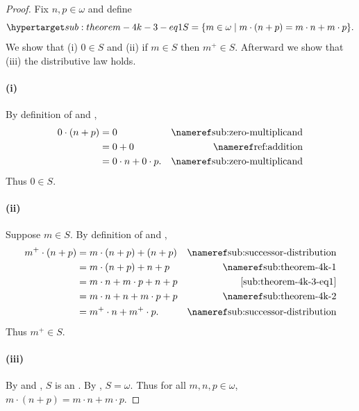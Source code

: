 \documentclass{report}
\begin{document}
\begin{proof}


  Fix $n, p \in \omega$ and define
    \begin{equation}
      \hyperlabel{sub:theorem-4k-3-eq1}
      S = \{m \in \omega \mid m \cdot (n + p) = m \cdot n + m \cdot p\}.
    \end{equation}
  We show that (i) $0 \in S$ and (ii) if $m \in S$ then $m^+ \in S$.
  Afterward we show that (iii) the distributive law holds.

  \paragraph{(i)}%

    By definition of  and ,
      \begin{align*}
        0 \cdot (n + p)
          & = 0 & \textref{sub:zero-multiplicand} \\
          & = 0 + 0 & \textref{ref:addition} \\
          & = 0 \cdot n + 0 \cdot p. & \textref{sub:zero-multiplicand}
      \end{align*}
    Thus $0 \in S$.

  \paragraph{(ii)}%

    Suppose $m \in S$.
    By definition of  and ,
      \begin{align*}
        m^+ \cdot (n + p)
          & = m \cdot (n + p) + (n + p)
            & \textref{sub:successor-distribution} \\
          & = m \cdot (n + p) + n + p & \textref{sub:theorem-4k-1} \\
          & = m \cdot n + m \cdot p + n + p
            & \eqref{sub:theorem-4k-3-eq1} \\
          & = m \cdot n + n + m \cdot p + p & \textref{sub:theorem-4k-2} \\
          & = m^+ \cdot n + m^+ \cdot p. & \textref{sub:successor-distribution}
      \end{align*}
    Thus $m^+ \in S$.

  \paragraph{(iii)}%

    By  and , $S$
      is an .
    By , $S = \omega$.
    Thus for all $m, n, p \in \omega$,
      $m \cdot (n + p) = m \cdot n + m \cdot p$.

\end{proof}
\end{document}
